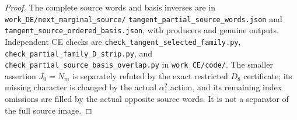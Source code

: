 \begin{proof}
The complete source words and basis inverses are in
\texttt{work\_\allowbreak DE/next\_\allowbreak marginal\_\allowbreak source/}\allowbreak
\texttt{tangent\_\allowbreak partial\_\allowbreak source\_\allowbreak words.json} and
\texttt{tangent\_\allowbreak source\_\allowbreak ordered\_\allowbreak basis.json}, with producers and
genuine outputs. Independent CE checks are
\texttt{check\_\allowbreak tangent\_\allowbreak selected\_\allowbreak family.py},
\texttt{check\_\allowbreak partial\_\allowbreak family\_\allowbreak D\_\allowbreak strip.py}, and
\texttt{check\_\allowbreak partial\_\allowbreak source\_\allowbreak basis\_\allowbreak overlap.py} in
\texttt{work\_\allowbreak CE/code/}. The smaller assertion \(J_0=N_m\) is
separately refuted by the exact restricted \(D_8\) certificate; its
missing character is changed by the actual \(\alpha_1^2\) action,
and its remaining index omissions are filled by the actual opposite
source words. It is not a separator of the full source image.
\end{proof}
